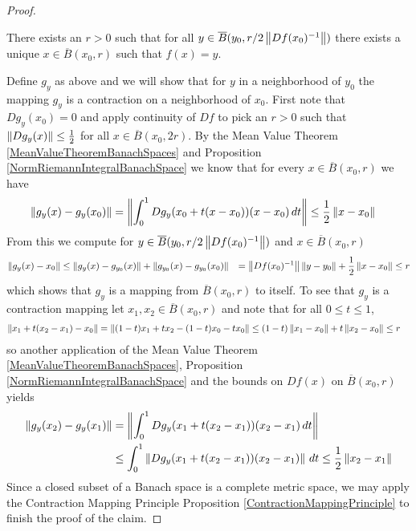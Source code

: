 \begin{proof}
\begin{clm}There exists an $r > 0$ such that for all $y \in \overline{B}(y_0, r/2 \left \lVert Df(x_0)^{-1} \right \rVert)$ there exists a unique $x \in \overline{B}(x_0, r)$ such that $f(x) = y$.
\end{clm}
Define $g_y$ as above and we will show that for $y$ in a neighborhood of $y_0$ the mapping $g_y$ is a contraction on a neighborhood of $x_0$.  First note that $D g_y(x_0) = 0$ and apply continuity of $Df$ to pick an $r > 0$ such that $\left \lVert D g_y (x) \right \rVert \leq \frac{1}{2}$ for all $x \in \overline{B}(x_0,2r)$.  By the Mean Value Theorem \ref{MeanValueTheoremBanachSpaces} and Proposition \ref{NormRiemannIntegralBanachSpace} we know that for every $x \in \overline{B}(x_0, r)$ we have 
\begin{align*}
\left \lVert g_y(x) - g_y(x_0) \right \rVert &= \left \lVert \int_0^1 Dg_y(x_0 + t(x-x_0)) (x - x_0) \, dt \right \rVert \leq \frac{1}{2} \left \lVert x - x_0 \right \rVert
\end{align*}
From this we compute for $y \in \overline{B}(y_0, r/2 \left \lVert Df(x_0)^{-1} \right \rVert)$ and $x \in \overline{B}(x_0, r)$
\begin{align*}
\left \lVert g_y(x) - x_0 \right \rVert &\leq \left \lVert g_y(x) - g_{y_0}(x) \right \rVert + \left \lVert g_{y_0}(x) - g_{y_0}(x_0) \right \rVert
&= \left \lVert Df(x_0)^{-1} \right \rVert \left \lVert y - y_0 \right \rVert + \frac{1}{2} \left \lVert x - x_0 \right \rVert \leq r
\end{align*}
which shows that $g_y$ is a mapping from $\overline{B}(x_0, r)$ to itself.  To see that $g_y$ is a contraction mapping let $x_1, x_2 \in \overline{B}(x_0, r)$ and note that for all $0 \leq t \leq 1$, 
\begin{align*}
\left \lVert x_1 + t (x_2 - x_1) - x_0 \right \rVert &= \left \lVert (1-t) x_1 + t x_2 - (1-t) x_0 - t x_0 \right \rVert  \leq (1-t) \left \lVert x_1-x_0 \right \rVert + t \left \lVert x_2 - x_0 \right \rVert \leq r
\end{align*} 
so another application of the Mean Value Theorem \ref{MeanValueTheoremBanachSpaces}, Proposition \ref{NormRiemannIntegralBanachSpace} and the bounds on $Df(x)$ on $\overline{B}(x_0, r)$ yields
\begin{align*}
\left \lVert g_y(x_2) - g_y(x_1) \right \rVert &= \left \lVert \int_0^1 Dg_y(x_1 + t(x_2 - x_1)) (x_2 - x_1) \, dt \right \rVert \\
&\leq \int_0^1 \left \lVert  Dg_y(x_1 + t(x_2 - x_1)) (x_2 - x_1) \right \rVert \, dt 
\leq \frac{1}{2} \left \lVert x_2 - x_1 \right \rVert
\end{align*}
Since a closed subset of a Banach space is a complete metric space, we may apply the Contraction Mapping Principle Proposition \ref{ContractionMappingPrinciple} to finish the proof of the claim.


\end{proof}
